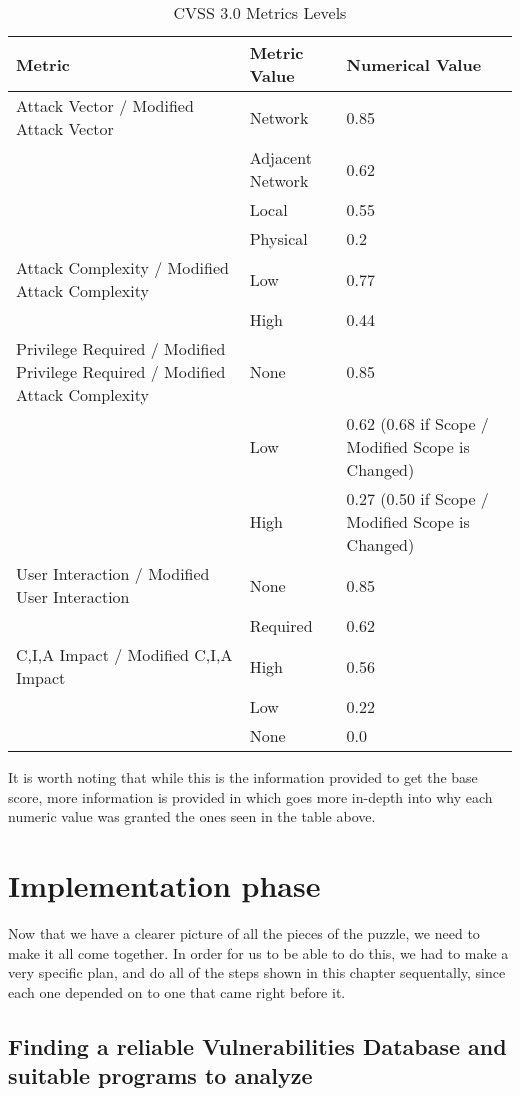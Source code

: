 \begin{table}[H]
	\centering
	\caption{CVSS 3.0 Metrics Levels}
	\begin{tabular}{ |p{5cm}||p{4cm}||p{4cm}|  }
		\hline
		Metric & Metric Value & Numerical Value\\
		\hline
		Attack Vector / Modified Attack Vector  & Network & 0.85\\ 
		& Adjacent Network  & 0.62\\ 
		& Local  & 0.55 \\ 
		& Physical  & 0.2 \\ 
		\hline
		Attack Complexity / Modified Attack Complexity  & Low & 0.77 \\ 
		& High & 0.44 \\
		\hline
		Privilege Required / Modified Privilege Required / Modified Attack Complexity  & None & 0.85  \\ 
		& Low & 0.62 (0.68 if Scope / Modified Scope is Changed) \\
		& High & 0.27 (0.50 if Scope / Modified Scope is Changed) \\
		\hline
		User Interaction / Modified User Interaction  & None & 0.85  \\ 
		& Required & 0.62 \\
		\hline
		C,I,A Impact / Modified C,I,A Impact  & High & 0.56   \\ 
		& Low & 0.22  \\
		& None & 0.0  \\
		\hline
	\end{tabular}
\end{table}

It is worth noting that while this is the information provided to get the base score, more information is provided in \parencite{cvss3} which goes more in-depth into why each numeric value was granted the ones seen in the table above.

\section{Implementation phase}

Now that we have a clearer picture of all the pieces of the puzzle, we need to make it all come together. In order for us to be able to do this, we had to make a very specific plan, and do all of the steps shown in this chapter sequentally, since each one depended on to one that came right before it.

\subsection{Finding a reliable Vulnerabilities Database and suitable programs to analyze}


